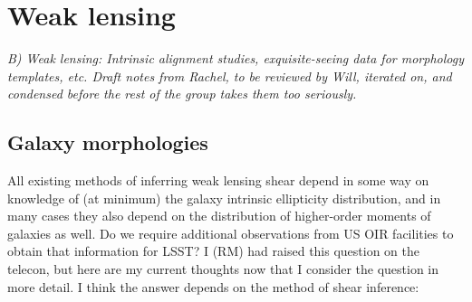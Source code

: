 \section{Weak lensing}
\label{sec:wl}

{\it B) Weak lensing: Intrinsic alignment studies, exquisite-seeing data
for morphology templates, etc. Draft notes from Rachel, to be reviewed
by Will, iterated on, and condensed before the rest of the group takes
them too seriously.}

\subsection{Galaxy morphologies}

All existing methods of inferring weak lensing shear depend in some way on knowledge of (at minimum)
the galaxy intrinsic ellipticity distribution, and in many cases they also depend on the
distribution of higher-order moments of galaxies as well.  Do we require additional observations
from US OIR facilities to obtain that information for LSST?  I (RM) had raised this question on the
telecon, but here are my current thoughts now that I consider the question in more detail.  I think
the answer depends on the method of shear inference:


